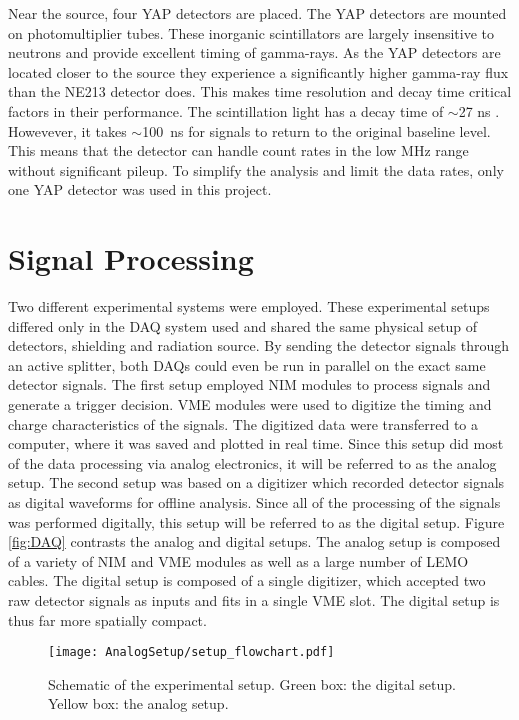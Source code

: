 \documentclass[main.tex]{subfiles}
\begin{document}
Near the source, four YAP detectors are placed. The YAP detectors are mounted on photomultiplier tubes. These inorganic scintillators are largely insensitive to neutrons and provide excellent timing of gamma-rays. As the YAP detectors are located closer to the source they experience a significantly higher gamma-ray flux than the NE213 detector does. This makes time resolution and decay time critical factors in their performance. The scintillation light has a decay time of $\sim$27 ns \cite{Scionix}. Howevever, it takes $\sim$\SI{100}{ns} for signals to return to the original baseline level. This means that the detector can handle count rates in the low MHz range without significant pileup. To simplify the analysis and limit the data rates, only one YAP detector was used in this project.

\section{Signal Processing}
Two different experimental systems were employed. These experimental setups differed only in the DAQ system used and shared the same physical setup of detectors, shielding and radiation source. By sending the detector signals through an active splitter, both DAQs could even be run in parallel on the exact same detector signals. The first setup employed NIM modules to process signals and generate a trigger decision. VME modules were used to digitize the timing and charge characteristics of the signals. The digitized data were transferred to a computer, where it was saved and plotted in real time. Since this setup did most of the data processing via analog electronics, it will be referred to as the analog setup. The second setup was based on a digitizer which recorded detector signals as digital waveforms for offline analysis. Since all of the processing of the signals was performed digitally, this setup will be referred to as the digital setup. Figure \ref{fig:DAQ} contrasts the analog and digital setups. The analog setup is composed of a variety of NIM and VME modules as well as a large number of LEMO cables. The digital setup is composed of a single digitizer, which accepted two raw detector signals as inputs and fits in a single VME slot. The digital setup is thus far more spatially compact.

\begin{figure}[h]
    \centering
        \texttt{[image: AnalogSetup/setup\_flowchart.pdf]}
        \caption[Schematic of the experimental setup]{Schematic of the experimental setup. Green box: the digital setup. Yellow box: the analog setup.}
    \label{fig:setup}
\end{figure}
\end{document}
